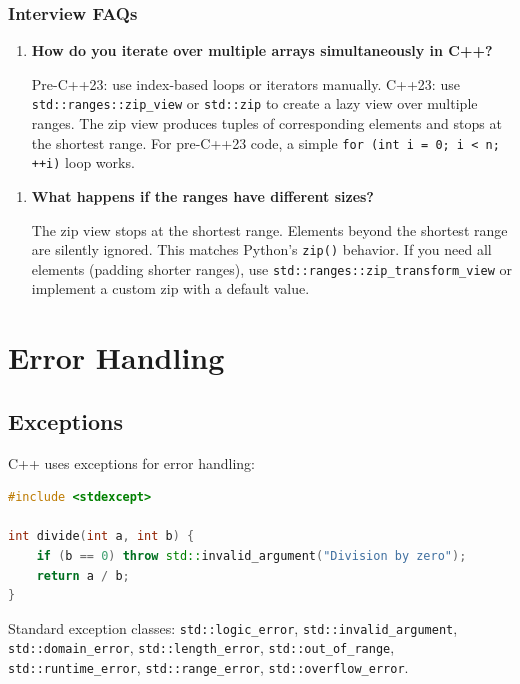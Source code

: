 \subsubsection{Interview FAQs}

\begin{enumerate}
\item \textbf{How do you iterate over multiple arrays simultaneously in C++?}

Pre-C++23: use index-based loops or iterators manually. C++23: use \texttt{std::ranges::zip\_view} or \texttt{std::zip} to create a lazy view over multiple ranges. The zip view produces tuples of corresponding elements and stops at the shortest range. For pre-C++23 code, a simple \texttt{for (int i = 0; i < n; ++i)} loop works.
\end{enumerate}

\begin{enumerate}
\item \textbf{What happens if the ranges have different sizes?}

The zip view stops at the shortest range. Elements beyond the shortest range are silently ignored. This matches Python's \texttt{zip()} behavior. If you need all elements (padding shorter ranges), use \texttt{std::ranges::zip\_transform\_view} or implement a custom zip with a default value.
\end{enumerate}

\section{Error Handling}

\subsection{Exceptions}

C++ uses exceptions for error handling:

\begin{lstlisting}[language=C++]
#include <stdexcept>

int divide(int a, int b) {
    if (b == 0) throw std::invalid_argument("Division by zero");
    return a / b;
}
\end{lstlisting}

Standard exception classes: \texttt{std::logic\_error}, \texttt{std::invalid\_argument}, \texttt{std::domain\_error}, \texttt{std::length\_error}, \texttt{std::out\_of\_range}, \texttt{std::runtime\_error}, \texttt{std::range\_error}, \texttt{std::overflow\_error}.

